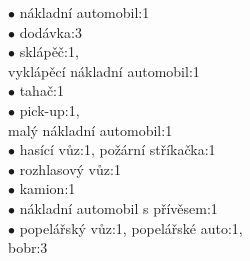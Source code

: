 {{\begin{multicols}{2}
\vspace{0.5cm}

\hspace*{0cm}$\bullet$ nákladní automobil:1\\
\hspace*{1cm}$\bullet$ dodávka:3\\
\hspace*{1cm}$\bullet$ sklápěč:1,\\
\hspace*{1cm}\phantom{$\bullet$}  vyklápěcí nákladní automobil:1\\
\hspace*{1cm}$\bullet$ tahač:1\\
\hspace*{1cm}$\bullet$ pick-up:1,\\
\hspace*{1cm}\phantom{$\bullet$} malý nákladní automobil:1\\
\hspace*{1cm}$\bullet$ hasící vůz:1, požární stříkačka:1\\
\hspace*{1cm}$\bullet$ rozhlasový vůz:1\\
\hspace*{1cm}$\bullet$ kamion:1\\
\hspace*{1cm}$\bullet$ nákladní automobil s přívěsem:1\\
\hspace*{1cm}$\bullet$ popelářský vůz:1, popelářské auto:1,\\
\hspace*{1cm}\phantom{$\bullet$} bobr:3\\

\columnbreak


\end{multicols}}}
